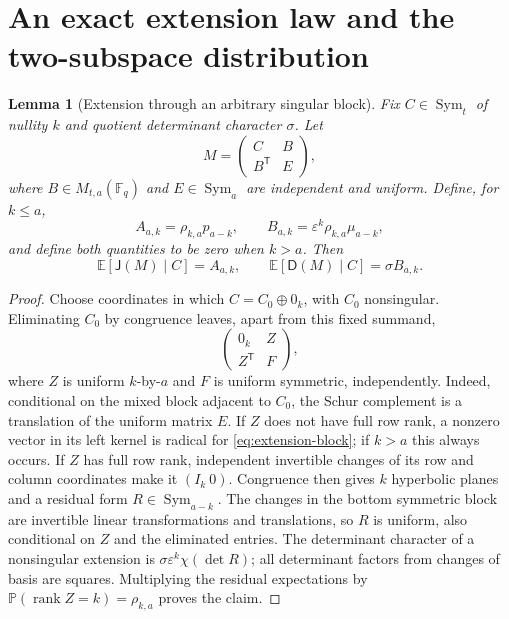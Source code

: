 \documentclass[11pt,a4paper]{article}
\newtheorem{lemma}[theorem]{Lemma}
\theoremstyle{definition}
\theoremstyle{remark}
\newcommand{\F}{\mathbb F}
\newcommand{\E}{\mathbb E}
\newcommand{\Pp}{\mathbb P}
\newcommand{\Sym}{\operatorname{Sym}}
\newcommand{\rank}{\operatorname{rank}}
\newcommand{\eps}{\varepsilon}
\newcommand{\J}{\mathsf J}
\newcommand{\D}{\mathsf D}
\begin{document}
\section{An exact extension law and the two-subspace distribution}
\label{sec:overlap}
\begin{lemma}[Extension through an arbitrary singular block]\label{lem:extension}
Fix $C\in\Sym_t$ of nullity $k$ and quotient determinant character $\sigma$.
Let
\[
 M=\begin{pmatrix}C&B\\B^{\mathsf T}&E\end{pmatrix},
\]
where $B\in M_{t,a}(\F_q)$ and $E\in\Sym_a$ are independent and uniform.
Define, for $k\le a$,
\begin{equation}\label{eq:AB-def}
 A_{a,k}=\rho_{k,a}p_{a-k},\qquad
 B_{a,k}=\eps^k\rho_{k,a}\mu_{a-k},
\end{equation}
and define both quantities to be zero when $k>a$. Then
\begin{equation}\label{eq:extension-moments}
 \E[\J(M)\mid C]=A_{a,k},\qquad
 \E[\D(M)\mid C]=\sigma B_{a,k}.
\end{equation}
\end{lemma}
\begin{proof}
Choose coordinates in which $C=C_0\oplus0_k$, with $C_0$ nonsingular.
Eliminating $C_0$ by congruence leaves, apart from this fixed summand,
\begin{equation}\label{eq:extension-block}
 \begin{pmatrix}0_k&Z\\Z^{\mathsf T}&F\end{pmatrix},
\end{equation}
where $Z$ is uniform $k$-by-$a$ and $F$ is uniform symmetric, independently.
Indeed, conditional on the mixed block adjacent to $C_0$, the Schur
complement is a translation of the uniform matrix $E$.
If $Z$ does not have full row rank, a nonzero vector in its left kernel
is radical for \eqref{eq:extension-block}; if $k>a$ this always occurs.
If $Z$ has full row rank, independent invertible changes of its row and
column coordinates make it $(I_k\ 0)$. Congruence then gives $k$ hyperbolic
planes and a residual form $R\in\Sym_{a-k}$. The changes in the bottom
symmetric block are invertible linear transformations and translations,
so $R$ is uniform, also conditional on $Z$ and the eliminated entries.
The determinant character of a nonsingular extension is
$\sigma\eps^k\chi(\det R)$; all determinant factors from changes of basis
are squares. Multiplying the residual expectations by
$\Pp(\rank Z=k)=\rho_{k,a}$ proves the claim.
\end{proof}
\end{document}
